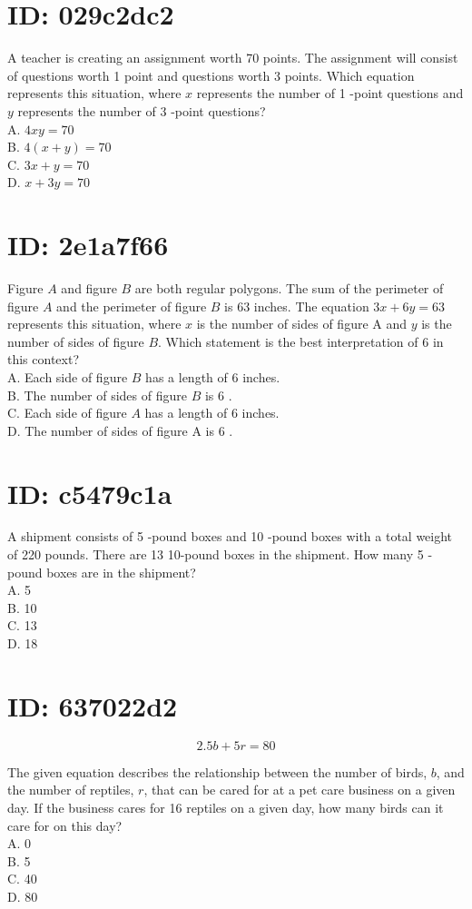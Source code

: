 \section*{ID: 029c2dc2}
A teacher is creating an assignment worth 70 points. The assignment will consist of questions worth 1 point and questions worth 3 points. Which equation represents this situation, where $x$ represents the number of 1 -point questions and $y$ represents the number of 3 -point questions?\\
A. $4 x y=70$\\
B. $4(x+y)=70$\\
C. $3 x+y=70$\\
D. $x+3 y=70$

\section*{ID: 2e1a7f66}
Figure $A$ and figure $B$ are both regular polygons. The sum of the perimeter of figure $A$ and the perimeter of figure $B$ is 63 inches. The equation $3 x+6 y=63$ represents this situation, where $x$ is the number of sides of figure A and $y$ is the number of sides of figure $B$. Which statement is the best interpretation of 6 in this context?\\
A. Each side of figure $B$ has a length of 6 inches.\\
B. The number of sides of figure $B$ is 6 .\\
C. Each side of figure $A$ has a length of 6 inches.\\
D. The number of sides of figure A is 6 .

\section*{ID: c5479c1a}
A shipment consists of 5 -pound boxes and 10 -pound boxes with a total weight of 220 pounds. There are 13 10-pound boxes in the shipment. How many 5 -pound boxes are in the shipment?\\
A. 5\\
B. 10\\
C. 13\\
D. 18

\section*{ID: 637022d2}
$$
2.5 b+5 r=80
$$

The given equation describes the relationship between the number of birds, $b$, and the number of reptiles, $r$, that can be cared for at a pet care business on a given day. If the business cares for 16 reptiles on a given day, how many birds can it care for on this day?\\
A. 0\\
B. 5\\
C. 40\\
D. 80

